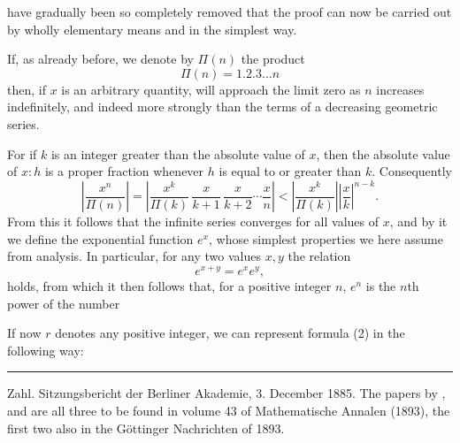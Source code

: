 
have gradually been so completely removed that the proof can now be carried out by wholly elementary means and in the simplest way.

If, as already before, we denote by $\Pi(n)$ the product
\[
\Pi(n) = 1.2.3\dots n
\]
then, if $x$ is an arbitrary quantity,
will approach the limit zero as $n$ increases indefinitely, and indeed more strongly than the terms of a decreasing geometric series.

For if $k$ is an integer greater than the absolute value of $x$, then the absolute value of $x : h$ is a proper fraction whenever $h$ is equal to or greater than $k$. Consequently
\[
\left|\frac{x^n}{\Pi(n)}\right| = \left|\frac{x^k}{\Pi(k)}\, \frac{x}{k+1}\, \frac{x}{k+2} \cdots \frac{x}{n}\right| < \left|\frac{x^k}{\Pi(k)}\right| \left|\frac{x}{k}\right|^{n-k}.
\]
From this it follows that the infinite series
converges for all values of $x$, and by it we define the exponential function $e^x$, whose simplest properties we here assume from analysis. In particular, for any two values $x, y$ the relation
\[
e^{x+y} = e^x e^y,
\]
holds, from which it then follows that, for a positive integer $n$, $e^n$ is the $n$th power of the number

If now $r$ denotes any positive integer, we can represent formula (2) in the following way:

\noindent\rule{4cm}{0.4pt}

Zahl\grqq{}. Sitzungsbericht der Berliner Akademie, 3. December 1885. The papers by ,  and  are all three to be found in volume 43 of Mathematische Annalen (1893), the first two also in the G\"ottinger Nachrichten of 1893.
